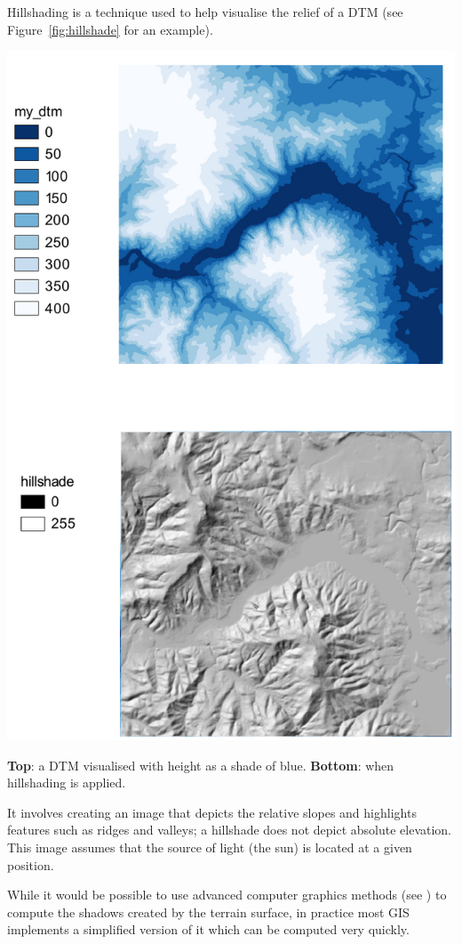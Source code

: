 Hillshading is a technique used to help visualise the relief of a DTM (see Figure~\ref{fig:hillshade} for an example).
\begin{marginfigure}
  \centering
  \includegraphics[width=\linewidth]{figs/hillshade}
  \caption{\textbf{Top}: a DTM visualised with height as a shade of blue. \textbf{Bottom}: when hillshading is applied.}%
\label{fig:hillshade}
\end{marginfigure}
It involves creating an image that depicts the relative slopes and highlights features such as ridges and valleys; a hillshade does not depict absolute elevation.
This image assumes that the source of light (the sun) is located at a given position.

While it would be possible to use advanced computer graphics methods (see ) to compute the shadows created by the terrain surface, in practice most GIS implements a simplified version of it which can be computed very quickly.

